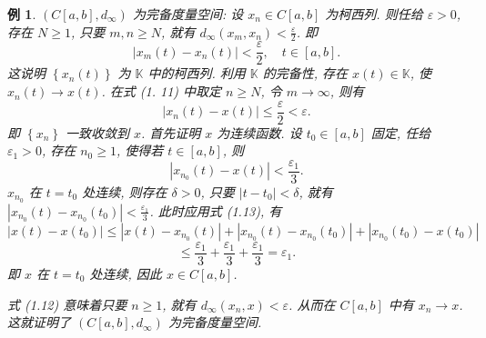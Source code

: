 \documentclass[openany]{ctexbook}
\theoremstyle{kaiti}
\theoremstyle{normal}
\newtheorem{example}{例}[section]
\begin{document}
\begin{example}
$\left(C[a, b], d_{\infty}\right)$ 为完备度量空间: 设 $x_n \in C[a, b]$ 为柯西列. 则任给 $\varepsilon>0$, 存在 $N \geqslant 1$, 只要 $m, n \geqslant N$, 就有 $d_{\infty}\left(x_m, x_n\right)<\frac{\varepsilon}{2}$. 即
\begin{equation}
  \left|x_m(t)-x_n(t)\right|<\frac{\varepsilon}{2}, \quad t \in[a, b].
\end{equation}
这说明 $\left\{x_n(t)\right\}$ 为 $\mathbb{K}$ 中的柯西列. 利用 $\mathbb{K}$ 的完备性, 存在 $x(t) \in \mathbb{K}$, 使 $x_n(t) \rightarrow x(t)$. 在式 (1. 11) 中取定 $n \geqslant N$, 令 $m \rightarrow \infty$, 则有
\begin{equation}
  \left|x_n(t)-x(t)\right| \leqslant \frac{\varepsilon}{2}<\varepsilon.
\end{equation}
即 $\left\{x_n\right\}$ 一致收敛到 $x$. 首先证明 $x$ 为连续函数. 设 $t_0 \in[a, b]$ 固定, 任给 $\varepsilon_1>0$, 存在 $n_0 \geqslant 1$, 使得若 $t \in[a, b]$, 则
\begin{equation}
  \left|x_{n_0}(t)-x(t)\right|<\frac{\varepsilon_1}{3}.
\end{equation}
$x_{n_0}$ 在 $t=t_0$ 处连续, 则存在 $\delta>0$, 只要 $\left|t-t_0\right|<\delta$, 就有 $\left|x_{n_0}(t)-x_{n_0}\left(t_0\right)\right|<\frac{\varepsilon_1}{3}$. 此时应用式 (1.13), 有
$$
\left|x(t)-x\left(t_0\right)\right| \leqslant\left|x(t)-x_{n_0}(t)\right|+\left|x_{n_0}(t)-x_{n_0}\left(t_0\right)\right|+\left|x_{n_0}\left(t_0\right)-x\left(t_0\right)\right|
$$
$$
\leqslant \frac{\varepsilon_1}{3}+\frac{\varepsilon_1}{3}+\frac{\varepsilon_1}{3}=\varepsilon_1.
$$
即 $x$ 在 $t=t_0$ 处连续, 因此 $x \in C[a, b]$.

式 (1.12) 意味着只要 $n \geqslant 1$, 就有 $d_{\infty}\left(x_n, x\right)<\varepsilon$. 从而在 $C[a, b]$ 中有 $x_n \rightarrow x$. 这就证明了 $\left(C[a, b], d_{\infty}\right)$ 为完备度量空间.
\end{example}
\end{document}
